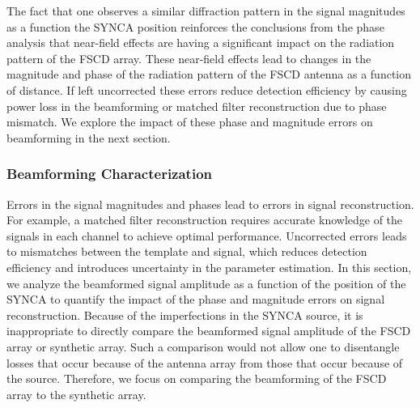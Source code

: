 The fact that one observes a similar diffraction pattern in the signal magnitudes as a function the SYNCA position reinforces the conclusions from the phase analysis that near-field effects are having a significant impact on the radiation pattern of the FSCD array. These near-field effects lead to changes in the magnitude and phase of the radiation pattern of the FSCD antenna as a function of distance. If left uncorrected these errors reduce detection efficiency by causing power loss in the beamforming or matched filter reconstruction due to phase mismatch. We explore the impact of these phase and magnitude errors on beamforming in the next section.

\subsubsection{Beamforming Characterization}
\label{sec:jugaad_bf_analysis}

Errors in the signal magnitudes and phases lead to errors in signal reconstruction. For example, a matched filter reconstruction requires accurate knowledge of the signals in each channel to achieve optimal performance. Uncorrected errors leads to mismatches between the template and signal, which reduces detection efficiency and introduces uncertainty in the parameter estimation. In this section, we analyze the beamformed signal amplitude as a function of the position of the SYNCA to quantify the impact of the phase and magnitude errors on signal reconstruction. Because of the imperfections in the SYNCA source, it is inappropriate to directly compare the beamformed signal amplitude of the FSCD array or synthetic array. Such a comparison would not allow one to disentangle losses that occur because of the antenna array from those that occur because of the source. Therefore, we focus on comparing the beamforming of the FSCD array to the synthetic array.

